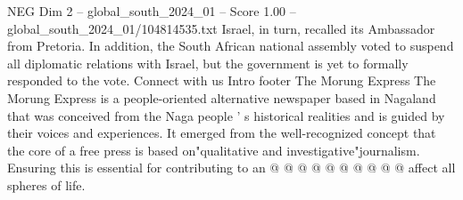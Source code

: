 \begin{textsample}{NEG Dim 2 – global\_south\_2024\_01 – Score 1.00 – global\_south\_2024\_01/104814535.txt}
Israel, in turn, recalled its Ambassador from Pretoria.
In addition, the South African national assembly voted to suspend all diplomatic relations with Israel, but the government is yet to formally responded to the vote.
Connect with us Intro footer The Morung Express The Morung Express is a people-oriented alternative newspaper based in Nagaland that was conceived from the Naga people ' s historical realities and is guided by their voices and experiences.
It emerged from the well-recognized concept that the core of a free press is based on"qualitative and investigative"journalism.
Ensuring this is essential for contributing to an @ @ @ @ @ @ @ @ @ @ affect all spheres of life.

\end{textsample}
